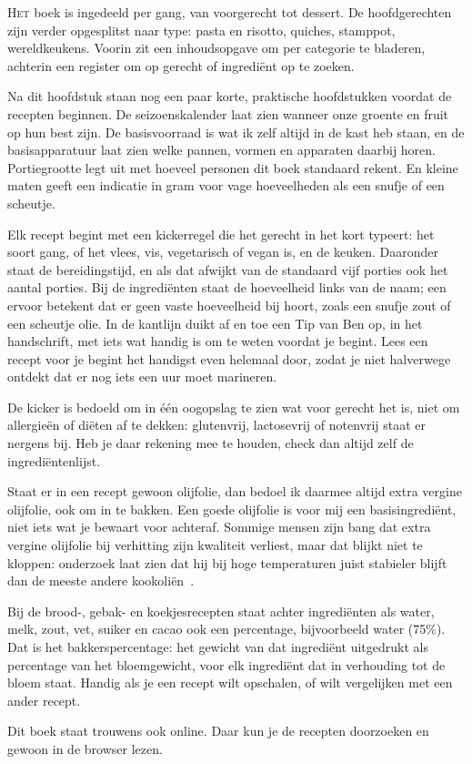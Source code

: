 
\lettrine{H}{et} boek is ingedeeld per gang, van voorgerecht tot dessert. De
hoofdgerechten zijn verder opgesplitst naar type: pasta en risotto, quiches,
stamppot, wereldkeukens. Voorin zit een inhoudsopgave om per categorie te
bladeren, achterin een register om op gerecht of ingrediënt op te zoeken.

Na dit hoofdstuk staan nog een paar korte, praktische hoofdstukken voordat de
recepten beginnen. De seizoenskalender laat zien wanneer onze groente en
fruit op hun best zijn. De basisvoorraad is wat ik zelf altijd in de kast heb
staan, en de basisapparatuur laat zien welke pannen, vormen en apparaten
daarbij horen. Portiegrootte legt uit met hoeveel personen dit boek standaard
rekent. En kleine maten geeft een indicatie in gram voor vage hoeveelheden
als een snufje of een scheutje.

Elk recept begint met een kickerregel die het gerecht in het kort typeert:
het soort gang, of het vlees, vis, vegetarisch of vegan is, en de keuken.
Daaronder staat de bereidingstijd, en als dat afwijkt van de standaard vijf
porties ook het aantal porties. Bij de ingrediënten staat de hoeveelheid
links van de naam; een \textcolor{terracotta}{\raisebox{0.15ex}{$\scriptstyle\blacklozenge$}}
ervoor betekent dat er geen vaste hoeveelheid bij hoort, zoals een snufje
zout of een scheutje olie. In de kantlijn duikt af en toe een Tip van Ben
op, in het handschrift, met iets wat handig is om te weten voordat je
begint. Lees een recept voor je begint het handigst even helemaal door,
zodat je niet halverwege ontdekt dat er nog iets een uur moet marineren.

De kicker is bedoeld om in één oogopslag te zien wat voor gerecht het is,
niet om allergieën of diëten af te dekken: glutenvrij, lactosevrij of
notenvrij staat er nergens bij. Heb je daar rekening mee te houden, check
dan altijd zelf de ingrediëntenlijst.

Staat er in een recept gewoon olijfolie, dan bedoel ik daarmee altijd extra
vergine olijfolie, ook om in te bakken. Een goede olijfolie is voor mij een
basisingrediënt, niet iets wat je bewaart voor achteraf. Sommige mensen
zijn bang dat extra vergine olijfolie bij verhitting zijn kwaliteit
verliest, maar dat blijkt niet te kloppen: onderzoek laat zien dat hij bij
hoge temperaturen juist stabieler blijft dan de meeste andere
kookoliën~\cite{dealzaa-olijfolie-verhitting}.

Bij de brood-, gebak- en koekjesrecepten staat achter ingrediënten als
water, melk, zout, vet, suiker en cacao ook een percentage, bijvoorbeeld
water (75\%). Dat is het bakkerspercentage: het gewicht van dat
ingrediënt uitgedrukt als percentage van het bloemgewicht, voor elk
ingrediënt dat in verhouding tot de bloem staat. Handig als je een
recept wilt opschalen, of wilt vergelijken met een ander recept.

Dit boek staat trouwens ook online. Daar kun je de recepten doorzoeken en
gewoon in de browser lezen\cite{kookboek-online}.
